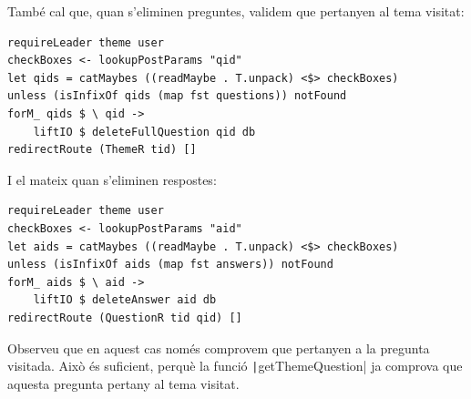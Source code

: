 \documentclass[catalan, a4paper]{scrartcl}
\begin{document}
També cal que, quan s'eliminen preguntes, validem que
pertanyen al tema visitat:

\begin{verbatim}
requireLeader theme user
checkBoxes <- lookupPostParams "qid"
let qids = catMaybes ((readMaybe . T.unpack) <$> checkBoxes)
unless (isInfixOf qids (map fst questions)) notFound
forM_ qids $ \ qid ->
    liftIO $ deleteFullQuestion qid db
redirectRoute (ThemeR tid) []
\end{verbatim}

I el mateix quan s'eliminen respostes:

\begin{verbatim}
requireLeader theme user
checkBoxes <- lookupPostParams "aid"
let aids = catMaybes ((readMaybe . T.unpack) <$> checkBoxes)
unless (isInfixOf aids (map fst answers)) notFound
forM_ aids $ \ aid ->
    liftIO $ deleteAnswer aid db
redirectRoute (QuestionR tid qid) []
\end{verbatim}

Observeu que en aquest cas només comprovem
que pertanyen a la pregunta visitada. Això és suficient, perquè la funció
\texttt|getThemeQuestion| ja comprova que aquesta pregunta
pertany al tema visitat.
\end{document}

